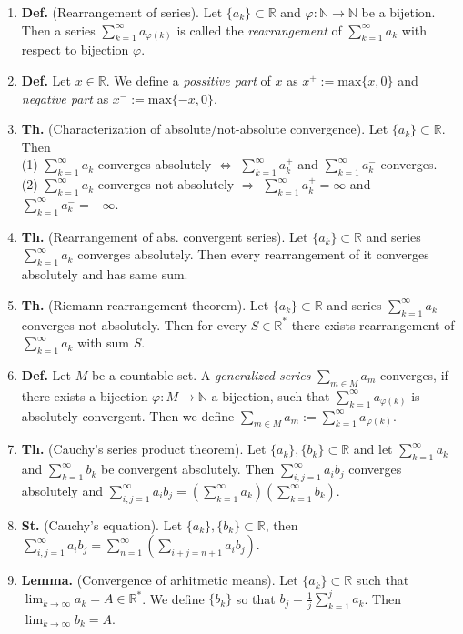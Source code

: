 \documentclass{article}
\newcommand{\<}{\left<}
\renewcommand{\>}{\right>}
\newcommand{\N}{\mathbb{N}}
\newcommand{\R}{\mathbb{R}}
\newcommand{\define}{\textbf{Def. }}
\newcommand{\lemma}{\textbf{Lemma. }}
\newcommand{\state}{\textbf{St. }}
\newcommand{\theor}{\textbf{Th. }}
\begin{document}
\begin{multicols}{3}
\begin{enumerate}[itemsep=2pt, topsep=2pt, partopsep=2pt, parsep=2pt]

        \item \define (Rearrangement of series). Let $\{a_k\}\subset\R$ and $\varphi:\N\to\N$ be a bijetion. Then a series $\sum_{k=1}^\infty a_{\varphi(k)}$ is called the \emph{rearrangement} of $\sum_{k=1}^\infty a_k$ with respect to bijection $\varphi$.
        \item \define Let $x\in\R$. We define a \emph{possitive part} of $x$ as $x^+:=\text{max}\{x,0\}$ and \emph{negative part} as $x^-:=\text{max}\{-x,0\}$.
        \item \theor (Characterization of absolute/not-absolute convergence). Let $\{a_k\}\subset\R$. Then\\
        (1) $\sum_{k=1}^\infty a_k$ converges absolutely $\Leftrightarrow$ $\sum_{k=1}^\infty a^+_k$ and $\sum_{k=1}^\infty a^-_k$ converges.\\
        (2) $\sum_{k=1}^\infty a_k$ converges not-absolutely $\Rightarrow$ $\sum_{k=1}^\infty a^+_k=\infty$ and $\sum_{k=1}^\infty a^-_k=-\infty$.\\
        \item \theor (Rearrangement of abs. convergent series). Let $\{a_k\}\subset\R$ and series $\sum_{k=1}^\infty a_k$ converges absolutely. Then every rearrangement of it converges absolutely and has same sum.
        \item \theor (Riemann rearrangement theorem). Let $\{a_k\}\subset\R$ and series $\sum_{k=1}^\infty a_k$ converges not-absolutely. Then for every $S\in\R^*$ there exists rearrangement of $\sum_{k=1}^\infty a_k$ with sum $S$.
        \item \define Let $M$ be a countable set. A \emph{generalized series} $\sum_{m\in M}a_m$ converges, if there exists a bijection $\varphi:M\to\N$ a bijection, such that $\sum_{k=1}^\infty a_{\varphi(k)}$ is absolutely convergent. Then we define $\sum_{m\in M}a_m:=\sum_{k=1}^\infty a_{\varphi(k)}$.
        \item \theor (Cauchy's series product theorem). Let $\{a_k\},\{b_k\}\subset\R$ and let $\sum_{k=1}^\infty a_k$ and $\sum_{k=1}^\infty b_k$ be convergent absolutely. Then $\sum_{i,j=1}^\infty a_ib_j$ converges absolutely and $\sum_{i,j=1}^\infty a_ib_j=(\sum_{k=1}^\infty a_k)(\sum_{k=1}^\infty b_k)$.
        \item \state (Cauchy's equation). Let $\{a_k\},\{b_k\}\subset\R$, then $\sum_{i,j=1}^\infty a_ib_j=\sum_{n=1}^\infty(\sum_{i+j=n+1}a_ib_j)$.
        \item \lemma (Convergence of arhitmetic means). Let $\{a_k\}\subset\R$ such that $\lim_{k\to\infty}a_k=A\in\R^*$. We define $\{b_k\}$ so that $b_j=\frac{1}{j}\sum_{k=1}^ja_k$. Then $\lim_{k\to\infty}b_k=A$.

\end{enumerate}
\end{multicols}
\end{document}
